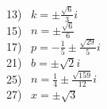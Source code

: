 \documentclass[11pt]{book}
\theoremstyle{definition}  %
\begin{document}
\begin{multicols}{2}
  13)~ $k=\pm\frac{\sqrt{6}}{3}i$\\
  15)~ $n=\pm\frac{\sqrt{6}}{6}$\\
  17)~ $p=-\frac{1}{5}\pm\frac{\sqrt{29}}{5}i$\\
  21)~ $b=\pm\sqrt{2}i$\\
  25)~ $n=\frac{1}{4}\pm\frac{\sqrt{159}}{12}i$\\
  27)~ $x=\pm\sqrt{3}$\\

\end{multicols}
\end{document}
